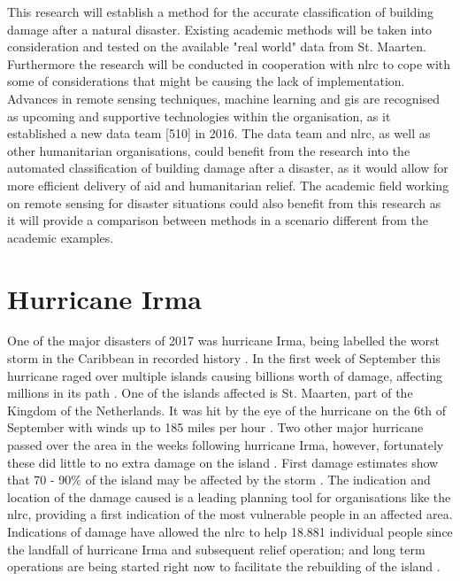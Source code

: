 This research will establish a method for the accurate classification of building damage after a natural disaster. Existing academic methods will be taken into consideration and tested on the available "real world" data from St. Maarten. Furthermore the research will be conducted in cooperation with \ac{nlrc} to cope with some of considerations that might be causing the lack of implementation. Advances in remote sensing techniques, machine learning and \ac{gis} are recognised as upcoming and supportive technologies within the organisation, as it established a new data team [510] in 2016. The data team and \ac{nlrc}, as well as other humanitarian organisations, could benefit from the research into the automated classification of building damage after a disaster, as it would allow for more efficient delivery of aid and humanitarian relief. The academic field working on remote sensing for disaster situations could also benefit from this research as it will provide a comparison between methods in a scenario different from the academic examples.

\section{Hurricane Irma}
One of the major disasters of 2017 was hurricane Irma, being labelled the worst storm in the Caribbean in recorded history \citep{Daniell2017}. In the first week of September this hurricane raged over multiple islands causing billions worth of damage, affecting millions in its path \citep{Phipps2017,Daniell2017}. One of the islands affected is St. Maarten, part of the Kingdom of the Netherlands. It was hit by the eye of the hurricane on the 6th of September with winds up to 185 miles per hour \citep{Wilts2017}. Two other major hurricane passed over the area in the weeks following hurricane Irma, however, fortunately these did little to no extra damage on the island \citep{Gray2017,Bijnsdorp2017}. First damage estimates show that 70 - 90\% of the island may be affected by the storm \citep{Rodekruis2017,UNOSAT2017}. The indication and location of the damage caused is a leading planning tool for organisations like the \ac{nlrc}, providing a first indication of the most vulnerable people in an affected area. Indications of damage have allowed the \ac{nlrc} to help 18.881 individual people since the landfall of hurricane Irma and subsequent relief operation; and long term operations are being started right now to facilitate the rebuilding of the island \citep{Rodekruis2017}. 


